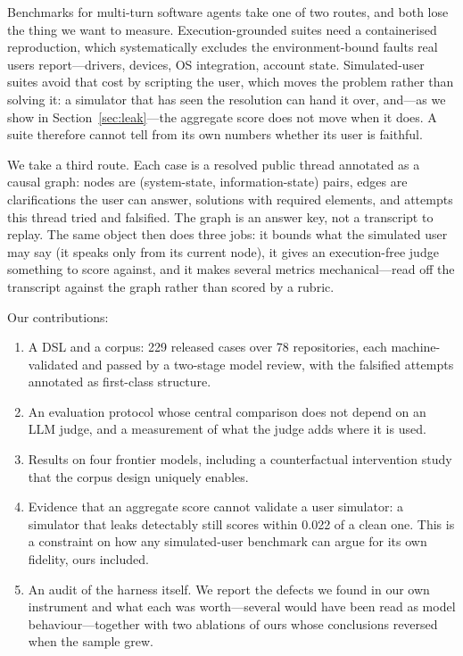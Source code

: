 \documentclass{article} %
\begin{document}
Benchmarks for multi-turn software agents take one of two routes, and
both lose the thing we want to measure. Execution-grounded suites
\citep{swebench2024} need a containerised reproduction, which
systematically excludes the environment-bound faults real users
report---drivers, devices, OS integration, account state. Simulated-user
suites \citep{taubench2024,cab2025} avoid that cost by scripting the
user, which moves the problem rather than solving it: a simulator that
has seen the resolution can hand it over, and---as we show in
Section~\ref{sec:leak}---the aggregate score does not move when it does.
A suite therefore cannot tell from its own numbers whether its user is
faithful.

We take a third route. Each case is a resolved public thread annotated as
a causal graph: nodes are (system-state, information-state) pairs, edges
are clarifications the user can answer, solutions with required elements,
and attempts this thread tried and falsified. The graph is an answer key,
not a transcript to replay. The same object then does three jobs: it
bounds what the simulated user may say (it speaks only from its current
node), it gives an execution-free judge something to score against, and
it makes several metrics mechanical---read off the transcript against
the graph rather than scored by a rubric.

Our contributions:

\begin{enumerate}
\item A DSL and a corpus: 229 released cases over 78 repositories, each
      machine-validated and passed by a two-stage model review, with the
      falsified attempts annotated as first-class structure.
\item An evaluation protocol whose central comparison does not depend on
      an LLM judge, and a measurement of what the judge adds where it is
      used.
\item Results on four frontier models, including a counterfactual
      intervention study that the corpus design uniquely enables.
\item Evidence that an aggregate score cannot validate a user simulator:
      a simulator that leaks detectably still scores within 0.022 of a
      clean one. This is a constraint on how any simulated-user benchmark
      can argue for its own fidelity, ours included.
\item An audit of the harness itself. We report the defects we found in
      our own instrument and what each was worth---several would have
      been read as model behaviour---together with two ablations of ours
      whose conclusions reversed when the sample grew.
\end{enumerate}
\end{document}
